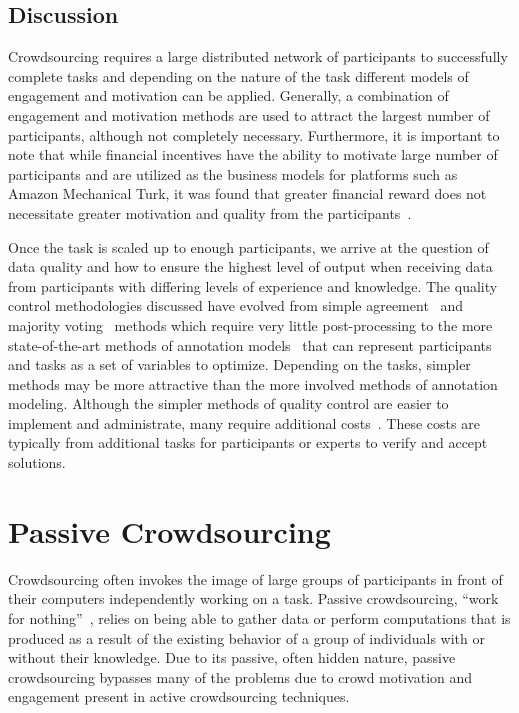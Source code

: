 \documentclass[10pt,twocolumn]{article}
\begin{document}
\subsection{Discussion}

Crowdsourcing requires a large distributed network of participants to 
successfully complete tasks and depending on the nature of the task 
different models of engagement and motivation can be applied. Generally,
a combination of engagement and motivation methods are used to attract
the largest number of participants, although not completely necessary. 
Furthermore, it is important to note that while financial incentives 
have the ability to motivate large number of participants and are utilized 
as the business models for platforms such as Amazon Mechanical Turk, it 
was found that greater financial reward does not necessitate greater 
motivation and quality from the participants~\cite{Mason2010a}.

Once the task is scaled up to enough participants, we arrive at 
the question of data quality and how to ensure the highest level of output
when receiving data from participants with differing levels of experience and 
knowledge. The quality control methodologies discussed have evolved from simple 
agreement~\cite{Law2009a,VonAhn2004} and majority 
voting~\cite{Sheng2008,VonAhn2008} methods which require very little 
post-processing to the more state-of-the-art methods of annotation 
models~\cite{Karger,Welinder} that can represent participants and 
tasks as a set of variables to optimize. Depending on the tasks, simpler
methods may be more attractive than the more involved methods of
annotation modeling. Although the simpler methods of quality 
control are easier to implement and administrate, many require additional 
costs~\cite{Sheng2008}. These costs are typically from additional tasks for 
participants or experts to verify and accept solutions.


\section{Passive Crowdsourcing}
\label{sec:passive}

Crowdsourcing often invokes the image of large groups of participants in 
front of their computers independently working on a task. Passive 
crowdsourcing, ``work for nothing''~\cite{Adar2011}, relies on being able 
to gather data or perform computations that is produced as a result of 
the existing behavior of a group of individuals with or without their 
knowledge. Due to its passive, often hidden nature, passive crowdsourcing 
bypasses many of the problems due to crowd motivation and engagement 
present in active crowdsourcing techniques.
\end{document}
